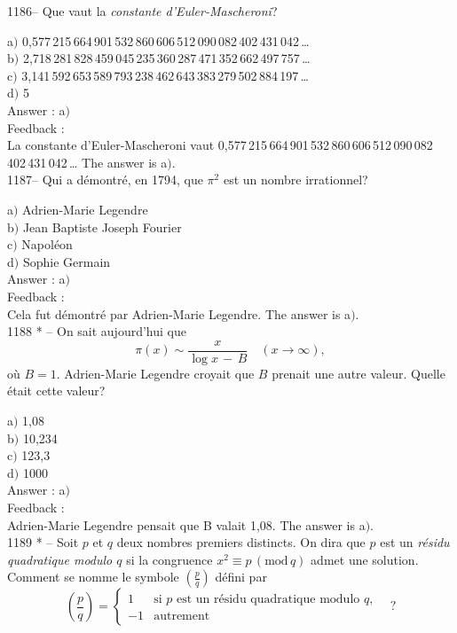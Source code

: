 ﻿\documentclass[letterpaper, 12pt]{article}
\begin{document}
1186-- Que vaut la {\sl constante d'Euler-Mascheroni}?

a$)$
0,577\,215\,664\,901\,532\,860\,606\,512\,090\,082\,402\,431\,042\,\ldots \\
b$)$
2,718\,281\,828\,459\,045\,235\,360\,287\,471\,352\,662\,497\,757\,\ldots \\
c$)$
3,141\,592\,653\,589\,793\,238\,462\,643\,383\,279\,502\,884\,197\,\ldots \\
d$)$ 5\\

Answer : a$)$\\

Feedback : \\
La constante d'Euler-Mascheroni vaut
0,577\,215\,664\,901\,532\,860\,606\,512\,090\,082\,402\,431\,042\,\ldots
The answer is a$)$.\\

1187-- Qui a d\'emontr\'e, en 1794, que $\pi^2$ est un nombre
irrationnel?

a$)$ Adrien-Marie Legendre \\
b$)$ Jean Baptiste Joseph Fourier \\
c$)$ Napol\'eon \\
d$)$ Sophie Germain\\

Answer : a$)$\\

Feedback : \\
Cela fut d\'emontr\'e par Adrien-Marie Legendre.
The answer is a$)$.\\

1188 * -- On sait aujourd'hui que
$$\pi(x)\sim\displaystyle\frac x{\log x\,-\,B}\quad(x\to\infty),$$
o\`u $B=1$. Adrien-Marie Legendre croyait que $B$ prenait une autre
valeur. Quelle \'etait cette valeur?

a$)$ 1,08 \\
b$)$ 10,234 \\
c$)$ 123,3 \\
d$)$ 1000\\

Answer : a$)$\\

Feedback : \\
Adrien-Marie Legendre pensait que B valait 1,08.
The answer is a$)$.\\

1189 * -- Soit $p$ et $q$ deux nombres premiers distincts.
On dira que  $p$ est un {\sl r\'esidu quadratique modulo $q$} si la
congruence $x^2\equiv p\,(\mathrm{mod}\,q)$
admet une solution.
Comment se nomme le symbole $(\frac pq)$ d\'efini par
$$\displaystyle{\left(\frac pq\right)=\begin{cases}
1&\text{si $p$ est un r\'esidu quadratique modulo $q$,}\\[3mm]
-1&\text{autrement}
\end{cases}}\quad?$$
\end{document}
